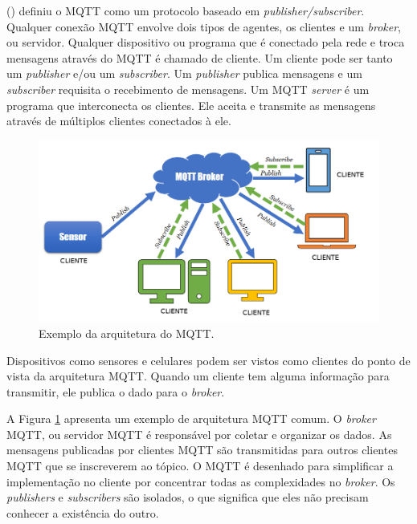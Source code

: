 \citeauthor{Kodali2017} (\citeyear{Kodali2017}) definiu o MQTT como um protocolo baseado em \textit {publisher/subscriber}. Qualquer conexão MQTT envolve dois tipos de agentes, os clientes e um \textit {broker}, ou servidor. Qualquer dispositivo ou programa que é conectado pela rede e troca mensagens através do MQTT é chamado de cliente. Um cliente pode ser tanto um \textit {publisher} e/ou um \textit {subscriber}. Um \textit {publisher} publica mensagens e um \textit {subscriber} requisita o recebimento de mensagens. Um MQTT \textit {server} é um programa que interconecta os clientes. Ele aceita e transmite as mensagens através de múltiplos clientes conectados à ele.

\begin{figure}[htbp]
	\centering
	\includegraphics[width=1\linewidth]{figuras/mqtt-architecture.png}
	\caption{Exemplo da arquitetura do MQTT.}
	\label{fig:arquitetura-mqtt}
\end{figure}

\newpage

Dispositivos como sensores e celulares podem ser vistos como clientes do ponto de vista da arquitetura MQTT. Quando um cliente tem alguma informação para transmitir, ele publica o dado para o \textit {broker}.

A Figura \ref{fig:arquitetura-mqtt} apresenta um exemplo de arquitetura MQTT comum. O \textit {broker} MQTT, ou servidor MQTT é responsável por coletar e organizar os dados. As mensagens publicadas por clientes MQTT são transmitidas para outros clientes MQTT que se inscreverem ao tópico. O MQTT é desenhado para simplificar a implementação no cliente por concentrar todas as complexidades no \textit {broker}. Os \textit {publishers} e \textit {subscribers} são isolados, o que significa que eles não precisam conhecer a existência do outro.


